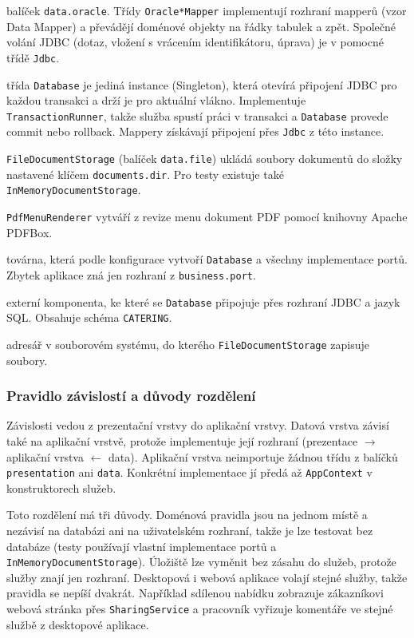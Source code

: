 \begin{description}[itemsep=2pt,style=unboxed]
  \item[Oracle mappery] balíček \texttt{data.oracle}. Třídy \texttt{Oracle*Mapper} implementují rozhraní mapperů (vzor Data Mapper) a převádějí doménové objekty na řádky tabulek a zpět. Společné volání JDBC (dotaz, vložení s vrácením identifikátoru, úprava) je v pomocné třídě \texttt{Jdbc}.
  \item[Připojení k databázi] třída \texttt{Database} je jediná instance (Singleton), která otevírá připojení JDBC pro každou transakci a drží je pro aktuální vlákno. Implementuje \texttt{TransactionRunner}, takže služba spustí práci v transakci a \texttt{Database} provede commit nebo rollback. Mappery získávají připojení přes \texttt{Jdbc} z této instance.
  \item[Úložiště dokumentů] \texttt{FileDocumentStorage} (balíček \texttt{data.file}) ukládá soubory dokumentů do složky nastavené klíčem \texttt{documents.dir}. Pro testy existuje také \texttt{InMemoryDocumentStorage}.
  \item[Export PDF] \texttt{PdfMenuRenderer} vytváří z revize menu dokument PDF pomocí knihovny Apache PDFBox.
  \item[DataAccessFactory] továrna, která podle konfigurace vytvoří \texttt{Database} a všechny implementace portů. Zbytek aplikace zná jen rozhraní z \texttt{business.port}.
  \item[Databázový server Oracle] externí komponenta, ke které se \texttt{Database} připojuje přes rozhraní JDBC a jazyk SQL. Obsahuje schéma \texttt{CATERING}.
  \item[Složka dokumentů] adresář v souborovém systému, do kterého \texttt{FileDocumentStorage} zapisuje soubory.
\end{description}

\subsubsection*{Pravidlo závislostí a důvody rozdělení}

Závislosti vedou z prezentační vrstvy do aplikační vrstvy. Datová vrstva závisí také na aplikační vrstvě, protože implementuje její rozhraní (prezentace $\rightarrow$ aplikační vrstva $\leftarrow$ data). Aplikační vrstva neimportuje žádnou třídu z balíčků \texttt{presentation} ani \texttt{data}. Konkrétní implementace jí předá až \texttt{AppContext} v konstruktorech služeb.

Toto rozdělení má tři důvody. Doménová pravidla jsou na jednom místě a nezávisí na databázi ani na uživatelském rozhraní, takže je lze testovat bez databáze (testy používají vlastní implementace portů a \texttt{InMemoryDocumentStorage}). Úložiště lze vyměnit bez zásahu do služeb, protože služby znají jen rozhraní. Desktopová i webová aplikace volají stejné služby, takže pravidla se nepíší dvakrát. Například sdílenou nabídku zobrazuje zákazníkovi webová stránka přes \texttt{SharingService} a pracovník vyřizuje komentáře ve stejné službě z desktopové aplikace.

